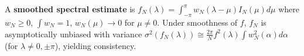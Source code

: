 A \textbf{smoothed spectral estimate} is $f_N(\lambda) = \int_{-\pi}^\pi w_N(\lambda - \mu) I_N(\mu) d\mu$ where $w_N \geq 0$, $\int w_N = 1$, $w_N(\mu) \to 0$ for $\mu \neq 0$. Under smoothness of $f$, $f_N$ is asymptotically unbiased with variance $\sigma^2(f_N(\lambda)) \cong \frac{2\pi}{N} f^2(\lambda) \int w_N^2(\alpha) d\alpha$ (for $\lambda \neq 0, \pm\pi$), yielding consistency.
